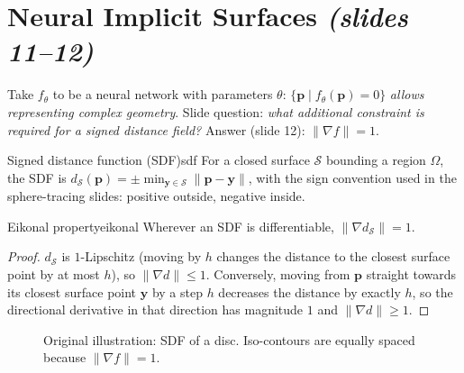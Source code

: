\documentclass[11pt,a4paper]{article}
\newcommand{\bp}{{\bm{p}}}
\begin{document}
\section{Neural Implicit Surfaces \emph{(slides 11--12)}}
Take $f_\theta$ to be a neural network with parameters $\theta$: $\{\bp\mid f_\theta(\bp)=0\}$ \emph{allows representing
complex geometry}. Slide question: \emph{what additional constraint is required for a signed distance field?}
Answer (slide 12): $\|\nabla f\|=1$.

\begin{Definition}{Signed distance function (SDF)}{sdf}
For a closed surface $\mathcal S$ bounding a region $\Omega$, the SDF is
$d_{\mathcal S}(\bp)=\pm\min_{\bm y\in\mathcal S}\|\bp-\bm y\|$, with the sign convention used in the sphere-tracing
slides: positive outside, negative inside.
\end{Definition}

\begin{Proposition}{Eikonal property}{eikonal}
Wherever an SDF is differentiable, $\|\nabla d_{\mathcal S}\|=1$.
\end{Proposition}
\begin{proof}
$d_{\mathcal S}$ is $1$-Lipschitz (moving by $h$ changes the distance to the closest surface point by at most $h$), so
$\|\nabla d\|\le 1$. Conversely, moving from $\bp$ straight towards its closest surface point $\bm y$ by a step $h$
decreases the distance by exactly $h$, so the directional derivative in that direction has magnitude $1$ and
$\|\nabla d\|\ge 1$.
\end{proof}

\begin{figure}[htbp]
\centering
{}
\caption{Original illustration: SDF of a disc. Iso-contours are equally spaced because $\|\nabla f\|=1$.}
\end{figure}
\end{document}
